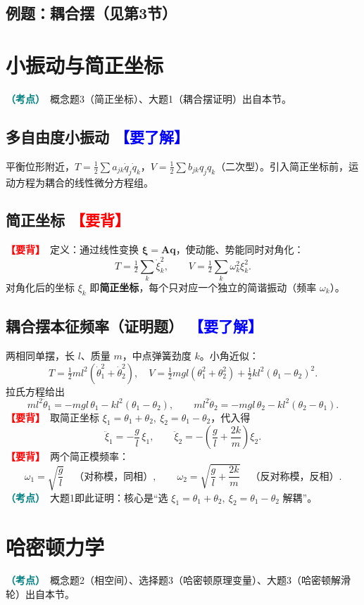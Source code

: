 \documentclass[UTF8,a4paper,11pt]{ctexart}
\newcommand{\bp}[1]{\textcolor{red}{\textbf{【要背】}}\ #1}
\newcommand{\uf}[1]{\textcolor{blue}{\textbf{【要了解】}}\ #1}
\newcommand{\imp}[1]{\textcolor{teal}{\textbf{（考点）}}\ #1}
\begin{document}
\subsection{例题：耦合摆（见第3节）}

\section{小振动与简正坐标}
\imp{概念题3（简正坐标）、大题1（耦合摆证明）出自本节。}

\subsection{多自由度小振动 \uf{}}
平衡位形附近，$T=\tfrac12\sum a_{jk}\dot q_j\dot q_k$，$V=\tfrac12\sum b_{jk}q_jq_k$（二次型）。引入简正坐标前，运动方程为耦合的线性微分方程组。

\subsection{简正坐标 \bp{}}
\bp{定义}：通过线性变换 $\bm\xi=\bm A\bm q$，使动能、势能同时对角化：
\[
T=\tfrac12\sum_k \dot\xi_k^2,\qquad V=\tfrac12\sum_k \omega_k^2\xi_k^2.
\]
对角化后的坐标 $\xi_k$ 即\textbf{简正坐标}，每个只对应一个独立的简谐振动（频率 $\omega_k$）。

\subsection{耦合摆本征频率（证明题） \uf{}}
两相同单摆，长 $l$、质量 $m$，中点弹簧劲度 $k$。小角近似：
\[
T=\tfrac12ml^2(\dot\theta_1^2+\dot\theta_2^2),\quad
V=\tfrac12mgl(\theta_1^2+\theta_2^2)+\tfrac12kl^2(\theta_1-\theta_2)^2.
\]
拉氏方程给出
\[
ml^2\ddot\theta_1=-mgl\,\theta_1-kl^2(\theta_1-\theta_2),\qquad
ml^2\ddot\theta_2=-mgl\,\theta_2-kl^2(\theta_2-\theta_1).
\]
\bp{取简正坐标} $\xi_1=\theta_1+\theta_2,\ \xi_2=\theta_1-\theta_2$，代入得
\[
\ddot\xi_1=-\frac{g}{l}\,\xi_1,\qquad
\ddot\xi_2=-\left(\frac{g}{l}+\frac{2k}{m}\right)\xi_2.
\]
\bp{两个简正模频率}：
\[
\boxed{\omega_1=\sqrt{\frac{g}{l}}}\quad\text{（对称模，同相）},\qquad
\boxed{\omega_2=\sqrt{\frac{g}{l}+\frac{2k}{m}}}\quad\text{（反对称模，反相）}.
\]
\imp{大题1即此证明：核心是“选 $\xi_1=\theta_1+\theta_2,\ \xi_2=\theta_1-\theta_2$ 解耦”。}

\section{哈密顿力学}
\imp{概念题2（相空间）、选择题3（哈密顿原理变量）、大题3（哈密顿解滑轮）出自本节。}
\end{document}
